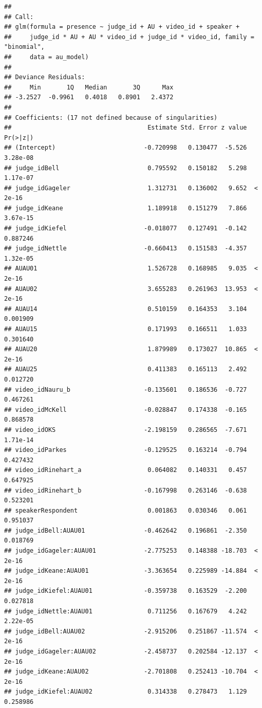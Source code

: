 \documentclass{monashthesis}
\begin{document}
\begin{verbatim}
## 
## Call:
## glm(formula = presence ~ judge_id + AU + video_id + speaker + 
##     judge_id * AU + AU * video_id + judge_id * video_id, family = "binomial", 
##     data = au_model)
## 
## Deviance Residuals: 
##     Min       1Q   Median       3Q      Max  
## -3.2527  -0.9961   0.4018   0.8901   2.4372  
## 
## Coefficients: (17 not defined because of singularities)
##                                     Estimate Std. Error z value Pr(>|z|)
## (Intercept)                        -0.720998   0.130477  -5.526 3.28e-08
## judge_idBell                        0.795592   0.150182   5.298 1.17e-07
## judge_idGageler                     1.312731   0.136002   9.652  < 2e-16
## judge_idKeane                       1.189918   0.151279   7.866 3.67e-15
## judge_idKiefel                     -0.018077   0.127491  -0.142 0.887246
## judge_idNettle                     -0.660413   0.151583  -4.357 1.32e-05
## AUAU01                              1.526728   0.168985   9.035  < 2e-16
## AUAU02                              3.655283   0.261963  13.953  < 2e-16
## AUAU14                              0.510159   0.164353   3.104 0.001909
## AUAU15                              0.171993   0.166511   1.033 0.301640
## AUAU20                              1.879989   0.173027  10.865  < 2e-16
## AUAU25                              0.411383   0.165113   2.492 0.012720
## video_idNauru_b                    -0.135601   0.186536  -0.727 0.467261
## video_idMcKell                     -0.028847   0.174338  -0.165 0.868578
## video_idOKS                        -2.198159   0.286565  -7.671 1.71e-14
## video_idParkes                     -0.129525   0.163214  -0.794 0.427432
## video_idRinehart_a                  0.064082   0.140331   0.457 0.647925
## video_idRinehart_b                 -0.167998   0.263146  -0.638 0.523201
## speakerRespondent                   0.001863   0.030346   0.061 0.951037
## judge_idBell:AUAU01                -0.462642   0.196861  -2.350 0.018769
## judge_idGageler:AUAU01             -2.775253   0.148388 -18.703  < 2e-16
## judge_idKeane:AUAU01               -3.363654   0.225989 -14.884  < 2e-16
## judge_idKiefel:AUAU01              -0.359738   0.163529  -2.200 0.027818
## judge_idNettle:AUAU01               0.711256   0.167679   4.242 2.22e-05
## judge_idBell:AUAU02                -2.915206   0.251867 -11.574  < 2e-16
## judge_idGageler:AUAU02             -2.458737   0.202584 -12.137  < 2e-16
## judge_idKeane:AUAU02               -2.701808   0.252413 -10.704  < 2e-16
## judge_idKiefel:AUAU02               0.314338   0.278473   1.129 0.258986

\end{verbatim}
\end{document}
